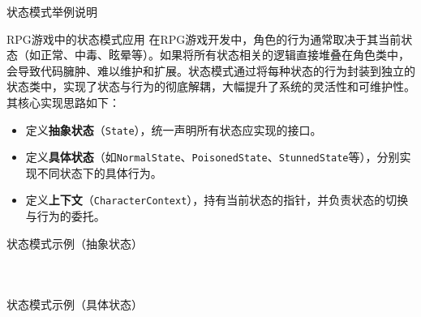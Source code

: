 \documentclass[UTF8,aspectratio=169]{beamer}
\begin{document}
\begin{frame}{状态模式举例说明}
    \begin{exampleytublock}{RPG游戏中的状态模式应用}
        在RPG游戏开发中，角色的行为通常取决于其当前状态（如正常、中毒、眩晕等）。如果将所有状态相关的逻辑直接堆叠在角色类中，会导致代码臃肿、难以维护和扩展。状态模式通过将每种状态的行为封装到独立的状态类中，实现了状态与行为的彻底解耦，大幅提升了系统的灵活性和可维护性。其核心实现思路如下：
        \begin{itemize}
            \item 定义\textbf{抽象状态}（\texttt{State}），统一声明所有状态应实现的接口。
            \item 定义\textbf{具体状态}（如\texttt{NormalState}、\texttt{PoisonedState}、\texttt{StunnedState}等），分别实现不同状态下的具体行为。
            \item 定义\textbf{上下文}（\texttt{CharacterContext}），持有当前状态的指针，并负责状态的切换与行为的委托。
        \end{itemize}
    \end{exampleytublock}
\end{frame}

\begin{frame}{状态模式示例（抽象状态）}
    \begin{columns}
        \begin{column}{0.48\textwidth}
            \inputminted[firstline=1, lastline=13]{cpp}{code/state_pattern.cpp}
        \end{column}
        \begin{column}{0.48\textwidth}
            \inputminted[firstline=15, lastline=24]{cpp}{code/state_pattern.cpp}
        \end{column}
    \end{columns}
\end{frame}

\begin{frame}{状态模式示例（具体状态）}
    \begin{columns}
        \begin{column}{0.48\textwidth}
            \inputminted[firstline=26, lastline=35]{cpp}{code/state_pattern.cpp}
        \end{column}
        \begin{column}{0.48\textwidth}
            \inputminted[firstline=37, lastline=46]{cpp}{code/state_pattern.cpp}
        \end{column}
    \end{columns}
\end{frame}
\end{document}
